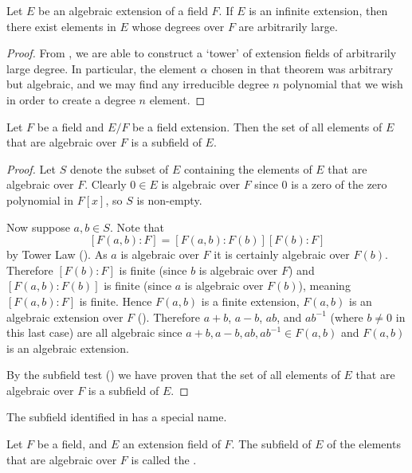\begin{corollary}\label{corollary-infinite-algebraic-extension-has-elements-of-arbitrarily-large-degree}
    Let $E$ be an algebraic extension of a field $F$. If $E$ is an infinite extension, then there exist elements in $E$ whose degrees over $F$ are arbitrarily large.
\end{corollary}
\begin{proof}
    From , we are able to construct a `tower' of extension fields of arbitrarily large degree. In particular, the element $\alpha$ chosen in that theorem was arbitrary but algebraic, and we may find any irreducible degree $n$ polynomial that we wish in order to create a degree $n$ element.
\end{proof}

\begin{corollary}\label{corollary-algebraic-closure-is-subfield}
    Let $F$ be a field and $E/F$ be a field extension. Then the set of all elements of $E$ that are algebraic over $F$ is a subfield of $E$.
\end{corollary}
\begin{proof}
    Let $S$ denote the subset of $E$ containing the elements of $E$ that are algebraic over $F$. Clearly $0 \in E$ is algebraic over $F$ since 0 is a zero of the zero polynomial in $F[x]$, so $S$ is non-empty.

    Now suppose $a,b \in S$. Note that
    \[
        [F(a,b):F] = [F(a,b):F(b)][F(b):F]
    \]
    by Tower Law (). As $a$ is algebraic over $F$ it is certainly algebraic over $F(b)$. Therefore $[F(b):F]$ is finite (since $b$ is algebraic over $F$) and $[F(a,b):F(b)]$ is finite (since $a$ is algebraic over $F(b)$), meaning $[F(a,b):F]$ is finite. Hence $F(a,b)$ is a finite extension, $F(a,b)$ is an algebraic extension over $F$ (). Therefore $a+b$, $a-b$, $ab$, and $ab^{-1}$ (where $b \neq 0$ in this last case) are all algebraic since $a+b,a-b,ab,ab^{-1} \in F(a,b)$ and $F(a,b)$ is an algebraic extension.

    By the subfield test () we have proven that the set of all elements of $E$ that are algebraic over $F$ is a subfield of $E$.
\end{proof}

The subfield identified in  has a special name.

\begin{definition}
    Let $F$ be a field, and $E$ an extension field of $F$. The subfield of $E$ of the elements that are algebraic over $F$ is called the .
\end{definition}


